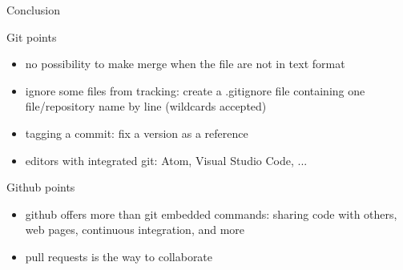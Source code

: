 \begin{frame}{Conclusion}
\begin{block}{Git points}
\begin{itemize}
    \item no possibility to make merge when the file are not in text format
    \item ignore some files from tracking: create a .gitignore file containing one file/repository name by line (wildcards accepted)
    \item tagging a commit: fix a version as a reference
    \item editors with integrated git: Atom, Visual Studio Code, ...
\end{itemize}
\end{block}
\begin{block}{Github points}
\begin{itemize}
    \item github offers more than git embedded commands: sharing code with others, web pages, continuous integration, and more
    \item pull requests is the way to collaborate
\end{itemize}
\end{block}
\end{frame}